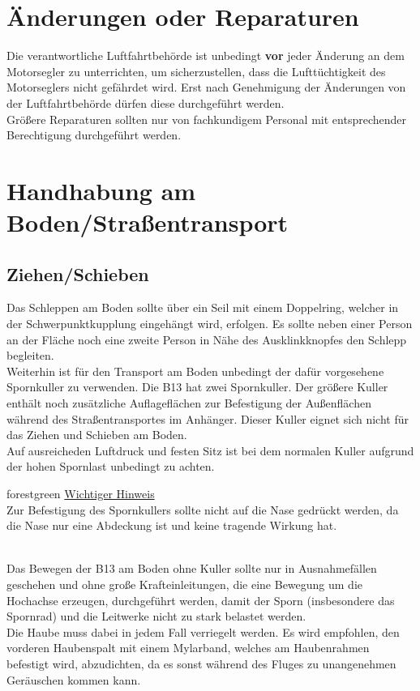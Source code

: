 \section{Änderungen oder Reparaturen}
Die verantwortliche Luftfahrtbehörde ist unbedingt \textbf{vor} jeder Änderung an dem Motorsegler zu unterrichten, um sicherzustellen, dass die Lufttüchtigkeit des Motorseglers nicht gefährdet wird. Erst nach Genehmigung der Änderungen von der Luftfahrtbehörde dürfen diese durchgeführt werden. \\
\newline
Größere Reparaturen sollten nur von fachkundigem Personal mit entsprechender Berechtigung durchgeführt werden. 
\newpage
\section{Handhabung am Boden/Straßentransport}

\subsection{Ziehen/Schieben}
Das Schleppen am Boden sollte über ein Seil mit einem Doppelring, welcher in der Schwerpunktkupplung eingehängt wird, erfolgen. Es sollte neben einer Person an der Fläche noch eine zweite Person in Nähe des Ausklinkknopfes den Schlepp begleiten. \\
\newline
Weiterhin ist für den Transport am Boden unbedingt der dafür vorgesehene Spornkuller zu verwenden. Die B13 hat zwei Spornkuller. Der größere Kuller enthält noch zusätzliche Auflageflächen zur Befestigung der Außenflächen während des Straßentransportes im Anhänger. Dieser Kuller eignet sich nicht für das Ziehen und Schieben am Boden. \\
Auf ausreicheden Luftdruck und festen Sitz ist bei dem normalen Kuller aufgrund der hohen Spornlast unbedingt zu achten.\\
\newline
\begin{color}{forestgreen}
\large{\underline{Wichtiger Hinweis}}\\
Zur Befestigung des Spornkullers sollte nicht auf die Nase gedrückt werden, da die Nase nur eine Abdeckung ist und keine tragende Wirkung hat.
\end{color}\\
\newline
Das Bewegen der B13 am Boden ohne Kuller sollte nur in Ausnahmefällen geschehen und ohne große Krafteinleitungen, die eine Bewegung um die Hochachse erzeugen, durchgeführt werden, damit der Sporn (insbesondere das Spornrad) und die Leitwerke nicht zu stark belastet werden.\\
\newline
Die Haube muss dabei in jedem Fall verriegelt werden. Es wird empfohlen, den vorderen Haubenspalt mit einem Mylarband, welches am Haubenrahmen befestigt wird, abzudichten, da es sonst während des Fluges zu unangenehmen Geräuschen kommen kann. 

